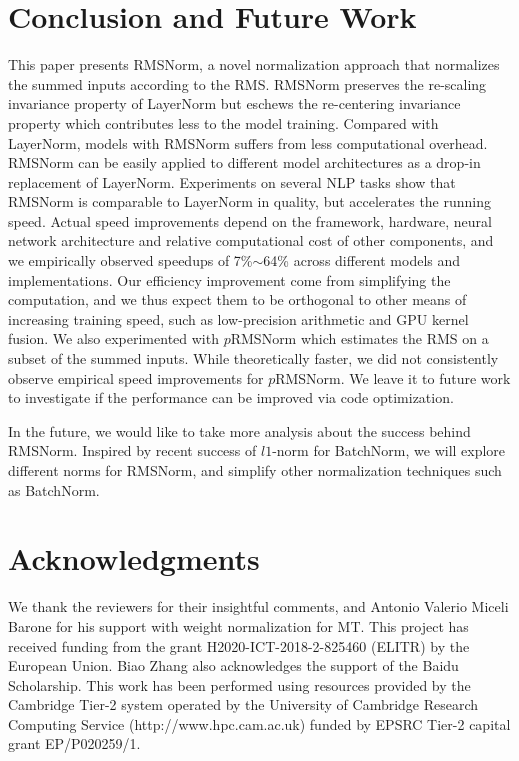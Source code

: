 \documentclass{article}
\begin{document}
\section{Conclusion and Future Work}

This paper presents RMSNorm, a novel normalization approach that normalizes the summed inputs according to the RMS. RMSNorm preserves the re-scaling invariance property of LayerNorm but eschews the re-centering invariance property which contributes less to the model training. Compared with LayerNorm, models with RMSNorm suffers from less computational overhead. RMSNorm can be easily applied to different model architectures as a drop-in replacement of LayerNorm. Experiments on several NLP tasks show that RMSNorm is comparable to LayerNorm in quality, but accelerates the running speed.
Actual speed improvements depend on the framework, hardware, neural network architecture and relative computational cost of other components, and we empirically observed speedups of 7\%$\sim$64\% across different models and implementations.
Our efficiency improvement come from simplifying the computation, and we thus expect them to be orthogonal to other means of increasing training speed, such as low-precision arithmetic and GPU kernel fusion.
We also experimented with $p$RMSNorm which estimates the RMS on a subset of the summed inputs. While theoretically faster, we did not consistently observe empirical speed improvements for $p$RMSNorm. We leave it to future work to investigate if the performance can be improved via code optimization. 

In the future, we would like to take more analysis about the success behind RMSNorm. Inspired by recent success of $l1$-norm for BatchNorm, we will explore different norms for RMSNorm, and simplify other normalization techniques such as BatchNorm.

\section*{Acknowledgments}

We thank the reviewers for their insightful comments, and Antonio Valerio Miceli Barone for his support with weight normalization for MT.
This project has received funding from the grant H2020-ICT-2018-2-825460 (ELITR) by the European Union.
Biao Zhang also acknowledges the support of the Baidu Scholarship. This work has been performed using resources provided by the Cambridge Tier-2 system operated by the University of Cambridge Research Computing Service (http://www.hpc.cam.ac.uk) funded by EPSRC Tier-2 capital grant EP/P020259/1.
\end{document}
